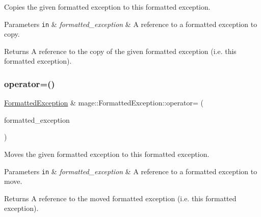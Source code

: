 Copies the given formatted exception to this formatted exception.


\begin{DoxyParams}[1]{Parameters}
\mbox{\tt in}  & {\em formatted\+\_\+exception} & A reference to a formatted exception to copy. \\
\hline
\end{DoxyParams}
\begin{DoxyReturn}{Returns}
A reference to the copy of the given formatted exception (i.\+e. this formatted exception). 
\end{DoxyReturn}
\hypertarget{structmage_1_1_formatted_exception_aed7565e923543206710aa5f71ba5893a}{}\label{structmage_1_1_formatted_exception_aed7565e923543206710aa5f71ba5893a} 
\subsubsection{\texorpdfstring{operator=()}{operator=()}\hspace{0.1cm}{\footnotesize\ttfamily [2/2]}}
{\footnotesize\ttfamily \hyperlink{structmage_1_1_formatted_exception}{Formatted\+Exception} \& mage\+::\+Formatted\+Exception\+::operator= (\begin{DoxyParamCaption}\item[{\hyperlink{structmage_1_1_formatted_exception}{Formatted\+Exception} \&\&}]{formatted\+\_\+exception }\end{DoxyParamCaption})\hspace{0.3cm}{\ttfamily [default]}}

Moves the given formatted exception to this formatted exception.


\begin{DoxyParams}[1]{Parameters}
\mbox{\tt in}  & {\em formatted\+\_\+exception} & A reference to a formatted exception to move. \\
\hline
\end{DoxyParams}
\begin{DoxyReturn}{Returns}
A reference to the moved formatted exception (i.\+e. this formatted exception). 
\end{DoxyReturn}
\hypertarget{structmage_1_1_formatted_exception_af4a63770e4f7091868d9e1e2382c1e70}{}\label{structmage_1_1_formatted_exception_af4a63770e4f7091868d9e1e2382c1e70} 
